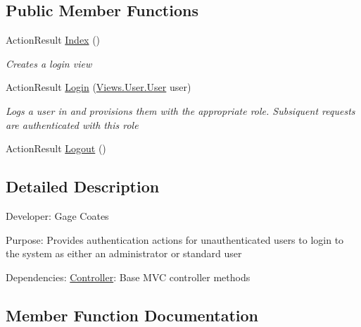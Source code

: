\subsection*{Public Member Functions}
\begin{DoxyCompactItemize}
\item 
Action\+Result \mbox{\hyperlink{class_eagle_eye_1_1_controllers_1_1_user_controller_a9562eb9abf6432e9360af19bb046a775}{Index}} ()
\begin{DoxyCompactList}\small\item\em Creates a login view \end{DoxyCompactList}\item 
Action\+Result \mbox{\hyperlink{class_eagle_eye_1_1_controllers_1_1_user_controller_ad2199840c954a1a465e25087fee02564}{Login}} (\mbox{\hyperlink{class_eagle_eye_1_1_views_1_1_user_1_1_user}{Views.\+User.\+User}} user)
\begin{DoxyCompactList}\small\item\em Logs a user in and provisions them with the appropriate role. Subsiquent requests are authenticated with this role \end{DoxyCompactList}\item 
Action\+Result \mbox{\hyperlink{class_eagle_eye_1_1_controllers_1_1_user_controller_a23b7abc37b240a70620675d09edecf8c}{Logout}} ()
\end{DoxyCompactItemize}


\subsection{Detailed Description}
Developer\+: Gage Coates 

Purpose\+: Provides authentication actions for unauthenticated users to login to the system as either an administrator or standard user

Dependencies\+: \mbox{\hyperlink{class_controller}{Controller}}\+: Base M\+VC controller methods 

\subsection{Member Function Documentation}
\mbox{\label{class_eagle_eye_1_1_controllers_1_1_user_controller_a9562eb9abf6432e9360af19bb046a775}} 
